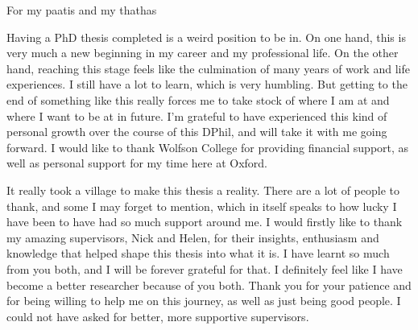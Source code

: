 \documentclass[a4paper, nobind]{templates/ociamthesis}
\begin{document}
\setcounter{secnumdepth}{2}
\setcounter{tocdepth}{1}



\begin{romanpages}

\maketitle

\begin{dedication}
  For my paatis and my thathas
\end{dedication}



\begin{acknowledgements}
 	Having a PhD thesis completed is a weird position to be in. On one hand, this is very much a new beginning in my career and my professional life. On the other hand, reaching this stage feels like the culmination of many years of work and life experiences. I still have a lot to learn, which is very humbling. But getting to the end of something like this really forces me to take stock of where I am at and where I want to be at in future. I'm grateful to have experienced this kind of personal growth over the course of this DPhil, and will take it with me going forward. I would like to thank Wolfson College for providing financial support, as well as personal support for my time here at Oxford.

 \hfill\break
 It really took a village to make this thesis a reality. There are a lot of people to thank, and some I may forget to mention, which in itself speaks to how lucky I have been to have had so much support around me. I would firstly like to thank my amazing supervisors, Nick and Helen, for their insights, enthusiasm and knowledge that helped shape this thesis into what it is. I have learnt so much from you both, and I will be forever grateful for that. I definitely feel like I have become a better researcher because of you both. Thank you for your patience and for being willing to help me on this journey, as well as just being good people. I could not have asked for better, more supportive supervisors.


\end{acknowledgements}
\end{romanpages}
\end{document}
